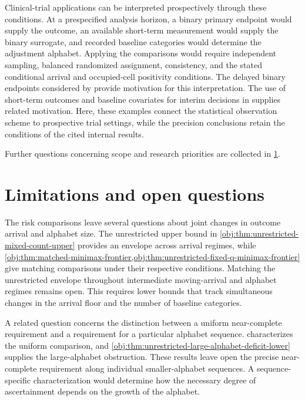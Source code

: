 \documentclass[11pt]{article}
\begin{document}
Clinical-trial applications can be interpreted prospectively through these conditions. At a prespecified analysis horizon, a binary primary endpoint would supply the outcome, an available short-term measurement would supply the binary surrogate, and recorded baseline categories would determine the adjustment alphabet. Applying the comparisons would require independent sampling, balanced randomized assignment, consistency, and the stated conditional arrival and occupied-cell positivity conditions. The delayed binary endpoints considered by \citet[Abstract]{MarschnerBecker2001} provide motivation for this interpretation. The use of short-term outcomes and baseline covariates for interim decisions in \citet[Abstract]{VanLancker2020} supplies related motivation. Here, these examples connect the statistical observation scheme to prospective trial settings, while the precision conclusions retain the conditions of the cited internal results.

Further questions concerning scope and research priorities are collected in \cref{sec:discussion-limitations-and-open-questions}.


\section{Limitations and open questions}
\label{sec:discussion-limitations-and-open-questions}

The risk comparisons leave several questions about joint changes in outcome arrival and alphabet size. The unrestricted upper bound in \cref{obj:thm:unrestricted-mixed-count-upper} provides an envelope across arrival regimes, while \cref{obj:thm:matched-minimax-frontier,obj:thm:unrestricted-fixed-q-minimax-frontier} give matching comparisons under their respective conditions. Matching the unrestricted envelope throughout intermediate moving-arrival and alphabet regimes remains open. This requires lower bounds that track simultaneous changes in the arrival floor and the number of baseline categories.

A related question concerns the distinction between a uniform near-complete requirement and a requirement for a particular alphabet sequence.  characterizes the uniform comparison, and \cref{obj:thm:unrestricted-large-alphabet-deficit-lower} supplies the large-alphabet obstruction. These results leave open the precise near-complete requirement along individual smaller-alphabet sequences. A sequence-specific characterization would determine how the necessary degree of ascertainment depends on the growth of the alphabet.
\end{document}
